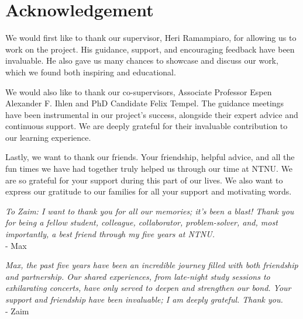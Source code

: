 \chapter*{Acknowledgement}
We would first like to thank our supervisor, Heri Ramampiaro, for allowing us to work on the project. His guidance, support, and encouraging feedback have been invaluable. He also gave us many chances to showcase and discuss our work, which we found both inspiring and educational.

We would also like to thank our co-supervisors, Associate Professor Espen Alexander F. Ihlen and PhD Candidate Felix Tempel. The guidance meetings have been instrumental in our project's success, alongside their expert advice and continuous support. We are deeply grateful for their invaluable contribution to our learning experience.

Lastly, we want to thank our friends. Your friendship, helpful advice, and all the fun times we have had together truly helped us through our time at NTNU. We are so grateful for your support during this part of our lives. We also want to express our gratitude to our families for all your support and motivating words. 

\begin{flushright}
\textit{To Zaim: I want to thank you for all our memories; it's been a blast! Thank you for being a fellow student, colleague, collaborator, problem-solver, and, most importantly, a best friend through my five years at NTNU.} \\
- Max
\end{flushright}

\begin{flushright}
\textit{Max, the past five years have been an incredible journey filled with both friendship and partnership. Our shared experiences, from late-night study sessions to exhilarating concerts, have only served to deepen and strengthen our bond. Your support and friendship have been invaluable; I am deeply grateful. Thank you.} \\
- Zaim
\end{flushright}


